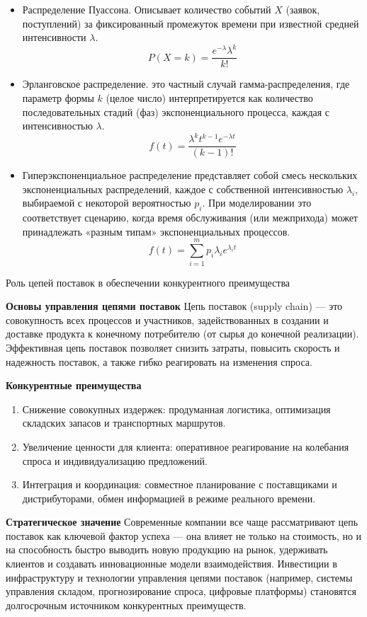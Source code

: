 \begin{itemize}
    \item Распределение Пуассона. Описывает количество событий $X$ (заявок, поступлений) за фиксированный промежуток времени при известной средней интенсивности $\lambda$. $$P(X=k) = \frac{e^{-\lambda}\lambda ^ k}{k!}$$
    \item Эрланговское распределение. это частный случай гамма-распределения, где параметр формы $k$ (целое число) интерпретируется как количество последовательных стадий (фаз) экспоненциального процесса, каждая с интенсивностью $\lambda$. $$f(t) = \frac{\lambda^k t ^{k-1} e^{-\lambda t}}{(k-1)!}$$
    \item Гиперэкспоненциальное распределение представляет собой смесь нескольких экспоненциальных распределений, каждое с собственной интенсивностью $\lambda_i$, выбираемой с некоторой вероятностью $p_i$. При моделировании это соответствует сценарию, когда время обслуживания (или межприхода) может принадлежать «разным типам» экспоненциальных процессов. $$f(t) = \sum \limits ^m _{i=1} p_i \lambda _i e^{\lambda_i t}$$    
\end{itemize}

Роль цепей поставок в обеспечении конкурентного преимущества

\textbf{Основы управления цепями поставок}
Цепь поставок (supply chain) --- это совокупность всех процессов и участников, задействованных в создании и доставке продукта к конечному потребителю (от сырья до конечной реализации). Эффективная цепь поставок позволяет снизить затраты, повысить скорость и надежность поставок, а также гибко реагировать на изменения спроса.

\textbf{Конкурентные преимущества}
\begin{enumerate}
    \item Снижение совокупных издержек: продуманная логистика, оптимизация складских запасов и транспортных маршрутов.
    \item Увеличение ценности для клиента: оперативное реагирование на колебания спроса и индивидуализацию предложений.
    \item Интеграция и координация: совместное планирование с поставщиками и дистрибуторами, обмен информацией в режиме реального времени.
\end{enumerate}

\textbf{Стратегическое значение}
Современные компании все чаще рассматривают цепь поставок как ключевой фактор успеха --- она влияет не только на стоимость, но и на способность быстро выводить новую продукцию на рынок, удерживать клиентов и создавать инновационные модели взаимодействия. Инвестиции в инфраструктуру и технологии управления цепями поставок (например, системы управления складом, прогнозирование спроса, цифровые платформы) становятся долгосрочным источником конкурентных преимуществ.


